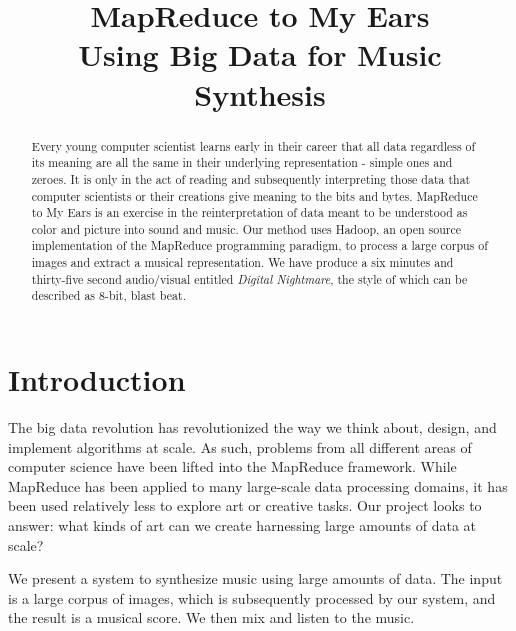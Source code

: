 \documentclass[10pt, conference, compsocconf]{IEEEtran}
\begin{document}
%

\title{MapReduce to My Ears\\
{\Large Using Big Data for Music Synthesis}
}

\author{
}

\maketitle

\begin{abstract}
Every young computer scientist learns early in their career that all
data regardless of its meaning are all the same in their underlying
representation - simple ones and zeroes.
 It is only in the act of
reading and subsequently interpreting those data that computer
scientists or their creations give meaning to the bits and bytes.
MapReduce to My Ears is an exercise in the reinterpretation of data
meant to be understood as color and picture into sound and music.
Our method uses Hadoop, an open source implementation of the MapReduce
programming paradigm, to process a large corpus of images and extract
a musical representation.
 We have produce a six minutes and
thirty-five second audio/visual entitled \emph{Digital Nightmare}, the
style of which can be described as 8-bit, blast beat.
\end{abstract}

\section{Introduction}
\label{sec:introduction}

The big data revolution has revolutionized the way we think about,
design, and implement algorithms at scale.  As such, problems from all
different areas of computer science have been lifted into the
MapReduce framework.  While MapReduce has been applied to many
large-scale data processing domains, it has been used relatively less
to explore art or creative tasks.  Our project looks to answer: what
kinds of art can we create harnessing large amounts of data at scale?

We present a system to synthesize music using large amounts of data.
The input is a large corpus of images, which is subsequently processed
by our system, and the result is a musical score.  We then mix and
listen to the music.
\end{document}
